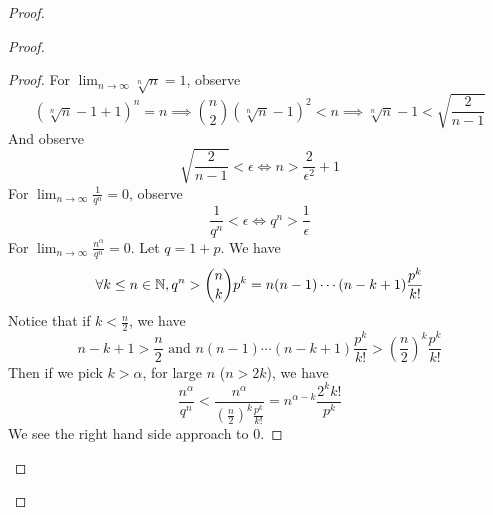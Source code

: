\documentclass{report}
\begin{document}
\begin{proof}
\begin{proof}
\begin{proof}
For $\lim_{n\to\infty}\sqrt[n]{n} =1$, observe
\begin{equation}
 (\sqrt[n]{n}-1+1)^n=n\implies \binom{n}{2} (\sqrt[n]{n}-1)^2<n\implies \sqrt[n]{n}-1<\sqrt{\frac{2}{n-1}}  
\end{equation}
And observe
\begin{equation}
\sqrt{\frac{2}{n-1}}<\epsilon  \iff n>\frac{2}{\epsilon^2}+1  
\end{equation}
For $\lim_{n\to\infty}\frac{1}{q^n}=0$, observe
\begin{equation}
\frac{1}{q^n}<\epsilon  \iff  q^n>\frac{1}{\epsilon }
\end{equation}
For $\lim_{n\to\infty}\frac{n^\alpha }{q^n}=0$. Let $q=1+p$. We have
 \begin{equation}
\forall k\leq n\in\mathbb{N}, q^n>\binom{n}{k}p^k=n(n-1)\cdots (n-k+1) \frac{p^k}{k!}
\end{equation}
Notice that if $k<\frac{n}{2}$, we have
 \begin{equation}
n-k+1>\frac{n}{2}\text{ and }n(n-1)\cdots (n-k+1) \frac{p^k}{k!}>(\frac{n}{2})^k \frac{p^k}{k!}
\end{equation}
Then if we pick $k>\alpha $, for large  $n$  ($n>2k$), we have 
\begin{equation}
\frac{n^{\alpha }}{q^n}<\frac{n^{\alpha }}{(\frac{n}{2})^k \frac{p^k}{k!}}=n^{\alpha -k}\frac{2^kk!}{p^k}
\end{equation}
We see the right hand side approach to $0$.
\end{proof}

\end{proof}
\end{proof}
\end{document}
